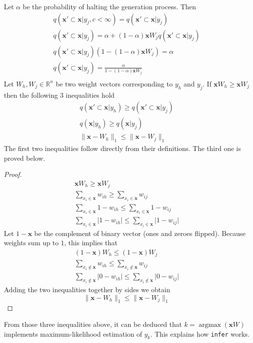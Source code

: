 \documentclass[12pt]{article}
\DeclareMathOperator*{\argmax}{argmax}
\begin{document}
Let $\alpha$ be the probability of halting the generation process. Then 
\begin{gather*}
q(\boldsymbol{x}' \subset \boldsymbol{x}|y_j,c<\infty) = q(\boldsymbol{x}' \subset \boldsymbol{x}|y_j) \\
q(\boldsymbol{x}' \subset \boldsymbol{x}|y_j) = \alpha + (1-\alpha)\boldsymbol{x}W_j q(\boldsymbol{x}' \subset \boldsymbol{x}|y_j) \\
q(\boldsymbol{x}' \subset \boldsymbol{x}|y_j)(1-(1-\alpha)\boldsymbol{x}W_j ) = \alpha \\
q(\boldsymbol{x}' \subset \boldsymbol{x}|y_j) = \frac{\alpha}{1-(1-\alpha)\boldsymbol{x}W_j } \\
\end{gather*}
Let $W_h,W_j \in \mathbb{R}^n$ be two weight vectors corresponding to $y_h$ and $y_j$. If $\boldsymbol{x}W_h \ge \boldsymbol{x}W_j$ then the following $3$ inequalities hold
\begin{gather*}
q(\boldsymbol{x}' \subset \boldsymbol{x} |y_h) \ge q(\boldsymbol{x}' \subset \boldsymbol{x} |y_j) \\
q(\boldsymbol{x} |y_h) \ge q(\boldsymbol{x} |y_j)   \\
\lVert \boldsymbol{x} - W_h \rVert_1 \le \lVert  \boldsymbol{x} - W_j \rVert_1
\end{gather*}
The first two inequalities follow directly from their definitions. The third one is proved below.
\begin{proof}
	\begin{gather*}
		\boldsymbol{x} W_h \ge \boldsymbol{x} W_j \\
		\sum_{x_i\in\boldsymbol{x} }w_{ih} \ge \sum_{x_i\in\boldsymbol{x} }w_{ij} \\
		\sum_{x_i\in\boldsymbol{x} }1-w_{ih} \le \sum_{x_i\in\boldsymbol{x} }1-w_{ij} \\
		\sum_{x_i\in\boldsymbol{x} }\vert 1-w_{ih}\vert \le \sum_{x_i\in\boldsymbol{x} }\vert 1-w_{ij}\vert
	\end{gather*}
	Let $1-\boldsymbol{x}$ be the complement of binary vector (ones and zeroes flipped). Because weights sum up to $1$, this implies that
	\begin{gather*}
		(1-\boldsymbol{x}) W_h \le (1-\boldsymbol{x}) W_j \\
		\sum_{x_i\notin\boldsymbol{x} }w_{ih} \le \sum_{x_i\notin\boldsymbol{x} }w_{ij} \\
		\sum_{x_i\notin\boldsymbol{x} }\vert 0-w_{ih}\vert \le \sum_{x_i\notin\boldsymbol{x} }\vert 0-w_{ij}\vert
	\end{gather*}
	Adding the two inequalities together by sides we obtain
	\[
	\lVert \boldsymbol{x} - W_h \rVert_1 \le \lVert  \boldsymbol{x} - W_j \rVert_1
	\]
\end{proof}
From those three inequalities above, it can be deduced that $k=\argmax(\boldsymbol{x}W)$ implements maximum-likelihood estimation of $y_k$.  This explains how \texttt{infer} works.
\end{document}
